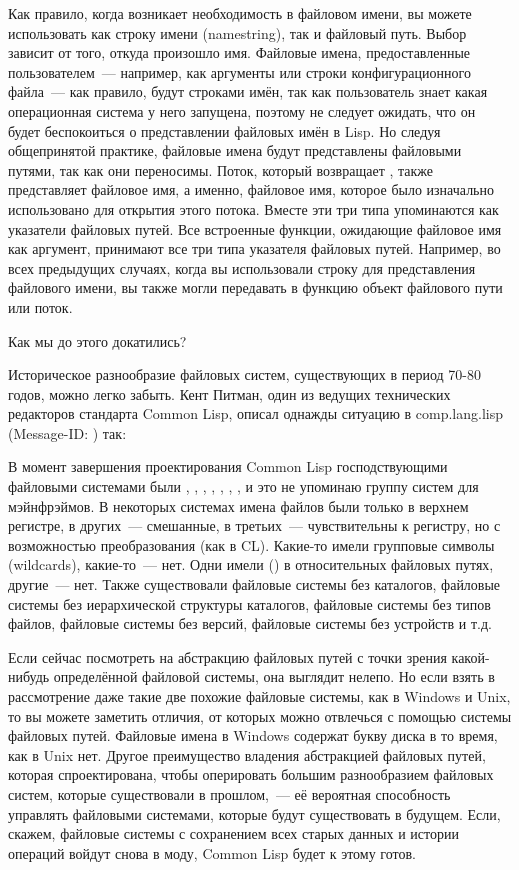 Как правило, когда возникает необходимость в файловом имени, вы можете использовать как
строку имени (namestring), так и файловый путь. Выбор зависит от того, откуда произошло
имя. Файловые имена, предоставленные пользователем~--- например, как аргументы или строки
конфигурационного файла~--- как правило, будут строками имён, так как пользователь знает
какая операционная система у него запущена, поэтому не следует ожидать, что он будет
беспокоиться о представлении файловых имён в Lisp. Но следуя общепринятой практике,
файловые имена будут представлены файловыми путями, так как они переносимы. Поток, который
возвращает , также представляет файловое имя, а именно, файловое имя, которое
было изначально использовано для открытия этого потока. Вместе эти три типа упоминаются
как указатели файловых путей. Все встроенные функции, ожидающие файловое имя как аргумент,
принимают все три типа указателя файловых путей. Например, во всех предыдущих случаях,
когда вы использовали строку для представления файлового имени, вы также могли передавать
в функцию объект файлового пути или поток.

Как мы до этого докатились?

Историческое разнообразие файловых систем, существующих в период 70-80 годов, можно легко
забыть. Кент Питман, один из ведущих технических редакторов стандарта Common Lisp, описал
однажды ситуацию в comp.lang.lisp (Message-ID: ) так:

В момент завершения проектирования Common Lisp господствующими файловыми системами были
, , , , , , , и это не упоминаю группу систем для мэйнфрэймов. В некоторых
системах имена файлов были только в верхнем регистре, в других~--- смешанные, в третьих~---
чувствительны к регистру, но с возможностью преобразования (как в CL). Какие-то имели
групповые символы (wildcards), какие-то~--- нет. Одни имели  () в
относительных файловых путях, другие~--- нет. Также существовали файловые системы без
каталогов, файловые системы без иерархической структуры каталогов, файловые системы без
типов файлов, файловые системы без версий, файловые системы без устройств и т.д.

Если сейчас посмотреть на абстракцию файловых путей с точки зрения какой-нибудь
определённой файловой системы, она выглядит нелепо. Но если взять в рассмотрение даже
такие две похожие файловые системы, как в Windows и Unix, то вы можете заметить отличия,
от которых можно отвлечься с помощью системы файловых путей. Файловые имена в Windows
содержат букву диска в то время, как в Unix нет. Другое преимущество владения абстракцией
файловых путей, которая спроектирована, чтобы оперировать большим разнообразием файловых
систем, которые существовали в прошлом,~--- её вероятная способность управлять файловыми
системами, которые будут существовать в будущем. Если, скажем, файловые системы с
сохранением всех старых данных и истории операций войдут снова в моду, Common Lisp будет к
этому готов.

